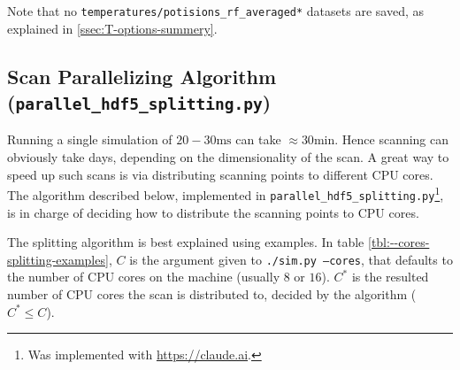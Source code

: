 Note that no \texttt{temperatures/potisions\_rf\_averaged*} datasets are saved, as explained in \ref{ssec:T-options-summery}.

\subsection{Scan Parallelizing Algorithm (\texttt{parallel\_hdf5\_splitting.py})}\label{ssec:manual/parallelized-simulating}

Running a single simulation of $20-30\mathrm{ms}$ can take $\approx 30 \mathrm{min}$. Hence scanning can obviously take days, depending on the dimensionality of the scan. A great way to speed up such scans is via distributing scanning points to different CPU cores. The algorithm described below, implemented in \texttt{parallel\_hdf5\_splitting.py}\footnote{Was implemented with \url{https://claude.ai}.}, is in charge of deciding how to distribute the scanning points to CPU cores.

The splitting algorithm is best explained using examples. In table \ref{tbl:--cores-splitting-examples}, $C$ is the argument given to \texttt{./sim.py --cores}, that defaults to the number of CPU cores on the machine (usually $8$ or $16$). $C^*$ is the resulted number of CPU cores the scan is distributed to, decided by the algorithm ($C^* \leq C$).

